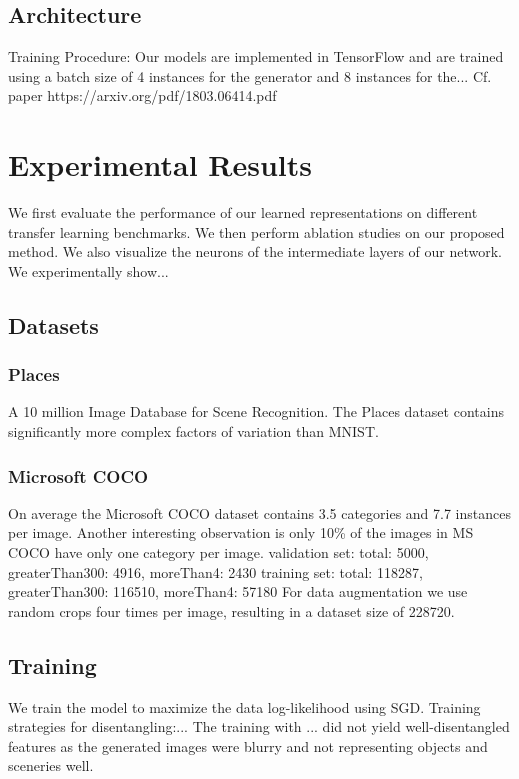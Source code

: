 \documentclass[10pt,letterpaper]{article}
\begin{document}
\subsection{Architecture}
Training Procedure: Our models are implemented in TensorFlow \cite{1605.08695} and are trained using a batch size of 4 instances for the generator and 8 instances for the...
Cf. paper https://arxiv.org/pdf/1803.06414.pdf

\section{Experimental Results}
We first evaluate the performance of our learned representations on different
transfer learning benchmarks. We then perform ablation studies on our proposed
method. We also visualize the neurons of the intermediate layers of our network.
We experimentally show...

\subsection{Datasets}
\subsubsection{Places}
A 10 million Image Database for Scene Recognition. The Places dataset contains significantly more complex factors of variation than MNIST.

\subsubsection{Microsoft COCO}
On average the Microsoft COCO dataset \cite{1405.0312} contains 3.5 categories and 7.7 instances per image. Another interesting observation is only 10\% of the images in MS COCO have only one category per image.
validation set: total: 5000, greaterThan300: 4916, moreThan4: 2430
training set: total: 118287, greaterThan300: 116510, moreThan4: 57180
For data augmentation we use random crops four times per image, resulting in a dataset size of 228720.

\subsection{Training}
We train the model to maximize the data log-likelihood using SGD.
Training strategies for disentangling:...
The training with ... did not yield well-disentangled features as the generated images were blurry and not representing objects and sceneries well. 
\end{document}
